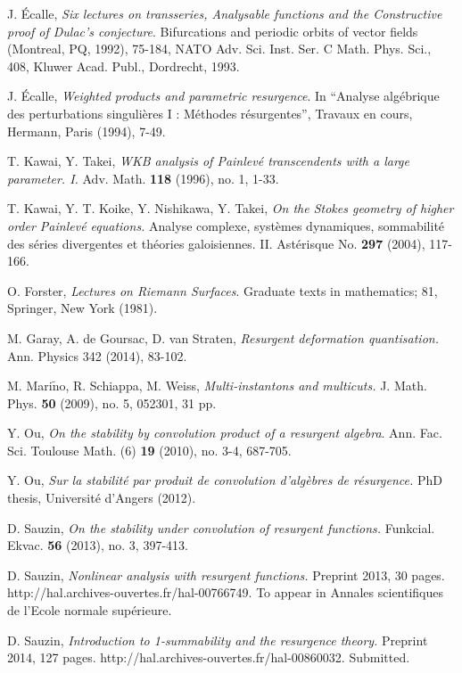\documentclass[11pt, english]{smfart}
\theoremstyle{definition}
\begin{document}
\begin{thebibliography}{BKM}
 J. \'Ecalle, \textit{Six lectures on transseries,
  Analysable functions and the Constructive proof of Dulac's
  conjecture}. Bifurcations and periodic orbits of vector fields
(Montreal, PQ, 1992),
75-184, NATO Adv. Sci. Inst. Ser. C Math. Phys. Sci., 408, Kluwer
Acad. Publ., Dordrecht, 1993.

 J. \'Ecalle, \textit{Weighted products and parametric
    resurgence}. In ``Analyse alg\'ebrique des perturbations singuli\`eres
  I : M\'ethodes r\'esurgentes'', Travaux en cours, Hermann, Paris
  (1994), 7-49.

 T. Kawai, Y. Takei, \textit{ 
WKB analysis of Painlev\'e transcendents with a large parameter. I.}
Adv. Math. \textbf{118} (1996), no. 1, 1-33. 

 T. Kawai, Y. T. Koike, Y. Nishikawa, Y. Takei,
\textit{ 
On the Stokes geometry of higher order Painlev\'e equations. }
Analyse complexe, syst\`emes dynamiques, sommabilit\'e des s\'eries 
divergentes et th\'eories galoisiennes. II. 
Ast\'erisque No.  \textbf{297} (2004), 117-166. 

 O. Forster, \textit{Lectures on Riemann Surfaces}.
Graduate texts in mathematics; 81, Springer, New York (1981).

 M. Garay, A. de Goursac, D. van Straten, 
\textit{Resurgent deformation quantisation.}
Ann. Physics 342 (2014), 83-102. 

 M. Mari$\tilde{\mathrm{n}}$o, R. Schiappa, M. Weiss, \textit{
Multi-instantons and multicuts.}
J. Math. Phys. \textbf{50} (2009), no. 5, 052301, 31 pp. 

 Y. Ou,
\textit{On the stability by convolution product of a resurgent
  algebra}.
Ann. Fac. Sci. Toulouse Math. (6) \textbf{19} (2010), no. 3-4,
687-705.

 Y. Ou, \textit{Sur la stabilit\'e par produit de
    convolution d'alg\`ebres de r\'esurgence.} PhD thesis,
Universit\'e d'Angers (2012). 

  D. Sauzin, \textit{On the stability under convolution
    of resurgent functions.}  
Funkcial. Ekvac. \textbf{56} (2013), no. 3, 397-413. 

 D. Sauzin, \textit{ Nonlinear analysis with
    resurgent functions. } Preprint 2013, 30 pages.
http://hal.archives-ouvertes.fr/hal-00766749. To appear in Annales
scientifiques de
l'Ecole normale sup\'erieure.

 D. Sauzin, \textit{Introduction to 1-summability and
    the resurgence theory.} Preprint 2014, 127 pages.
http://hal.archives-ouvertes.fr/hal-00860032. Submitted.

\end{thebibliography}
\end{document}
